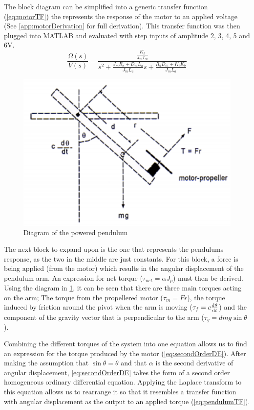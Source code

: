 \documentclass[a4paper, 11pt, compsoc]{IEEEtran}
\begin{document}
        The block diagram can be simplified into a generic transfer function (\cref{eq:motorTF}) the represents the response of the motor to an applied voltage (See \cref{app:motorDerivation} for full derivation). This transfer function was then plugged into MATLAB and evaluated with step inputs of amplitude 2, 3, 4, 5 and 6V.
        \begin{equation} \label{eq:motorTF}
            \frac{\Omega(s)}{V(s)} = \frac{\frac{K_t}{J_mL_a}}{s^2  + \frac{J_mR_a + D_mL_a}{J_mL_a}s + \frac{R_aD_m+K_tK_b}{J_mL_a}}
        \end{equation}

        \begin{figure}[!h]
            \centering
            \includegraphics[width=\columnwidth]{pendulum.png}
            \caption{Diagram of the powered pendulum}
            \label{fig:pendulum}
        \end{figure}

        The next block to expand upon is the one that represents the pendulums response, as the two in the middle are just constants. For this block, a force is being applied (from the motor) which results in the angular displacement of the pendulum arm. An expression for net torque ($\tau_{net} = \alpha J_p$) must then be derived. Using the diagram in \cref{fig:pendulum}, it can be seen that there are three main torques acting on the arm; The torque from the propellered motor ($\tau_m = Fr$), the torque induced by friction around the pivot when the arm is moving ($\tau_f = c\dv{\theta}{t}$) and the component of the gravity vector that is perpendicular to the arm ($\tau_g = dmg\sin{\theta}$). 
        \par
        Combining the different torques of the system into one equation allows us to find an expression for the torque produced by the motor (\cref{eq:secondOrderDE}). After making the assumption that $\sin{\theta} = \theta$ and that $\alpha$ is the second derivative of angular displacement, \cref{eq:secondOrderDE} takes the form of a second order homogeneous ordinary differential equation. Applying the Laplace transform to this equation allows us to rearrange it so that it resembles a transfer function with angular displacement as the output to an applied torque (\cref{eq:pendulumTF}).
\end{document}
